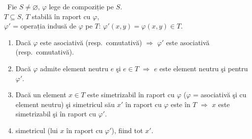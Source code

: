 \documentclass[12pt]{article}
\begin{document}
\bigskip
\noindent{} \ Fie $S\neq\varnothing$, $\varphi$ lege de compoziție pe $S$.\\
$T\subseteq S$, $T$ stabilă în raport cu $\varphi$,\\
$\varphi'$ = operația indusă de $\varphi$ pe $T$: $\varphi'(x,y)=\varphi(x,y)\in T$.

\begin{enumerate}
\item[(1)] Dacă $\varphi$ este asociativă (resp.\ comutativă) $\Rightarrow$ $\varphi'$ este asociativă (resp.\ comutativă).
\item[(2)] Dacă $\varphi$ admite element neutru $e$ şi $e\in T$ $\Rightarrow$ $e$ este element neutru şi pentru $\varphi'$.
\item[(3)] Dacă un element $x\in T$ este simetrizabil în raport cu $\varphi$ ($\varphi$ = asociativă şi cu element neutru) şi simetricul său $x'$ în raport cu $\varphi$ este în $T$ $\Rightarrow$ $x$ este simetrizabil şi în raport cu $\varphi'$.
\item[(4)] simetricul (lui $x$ în raport cu $\varphi'$), fiind tot $x'$.
\end{enumerate}
\end{document}
